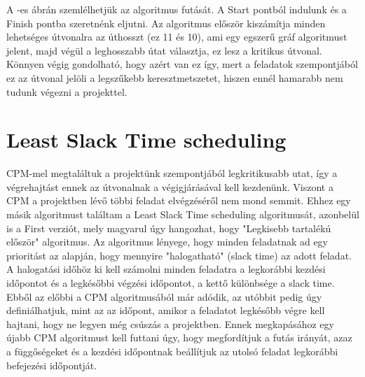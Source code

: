 A -es ábrán szemlélhetjük az algoritmus futását. A Start pontból indulunk és a Finish pontba szeretnénk eljutni. Az algoritmus először kiszámítja minden lehetséges útvonalra az úthosszt (ez 11 és 10), ami egy egszerű gráf algoritmust jelent, majd végül a leghosszabb útat választja, ez lesz a kritikus útvonal. Könnyen végig gondolható, hogy azért van ez így, mert a feladatok szempontjából ez az útvonal jelöli a legszűkebb keresztmetszetet, hiszen ennél hamarabb nem tudunk végezni a projekttel.

\section{Least Slack Time scheduling}
\hspace{2mm}  \indent CPM-mel megtaláltuk a projektünk szempontjából legkritikusabb utat, így a végrehajtást ennek az útvonalnak a végigjárásával kell kezdenünk. Viszont a CPM  a projektben lévő többi feladat elvégzéséről nem mond semmit. Ehhez egy másik algoritmust találtam a Least Slack Time scheduling algoritmusát, azonbelül is a First verziót, mely magyarul úgy hangozhat, hogy "Legkisebb tartalékú először" algoritmus.\cite{LST} Az algoritmus lényege, hogy minden feladatnak ad egy prioritást az alapján, hogy mennyire "halogatható" (slack time) az adott feladat. A halogatási időhöz ki kell számolni minden feladatra a legkorábbi kezdési időpontot és a legkésőbbi végzési időpontot, a kettő különbsége a slack time. Ebből az előbbi a CPM algoritmusából már adódik, az utóbbit pedig úgy definiálhatjuk, mint az az időpont, amikor a feladatot legkésőbb végre kell hajtani, hogy ne legyen még csúszás a projektben. Ennek megkapásához egy újabb CPM algoritmust kell futtani úgy, hogy megfordítjuk a futás irányát, azaz a függőségeket és a kezdési időpontnak beállítjuk az utolsó feladat legkorábbi befejezési időpontját. 